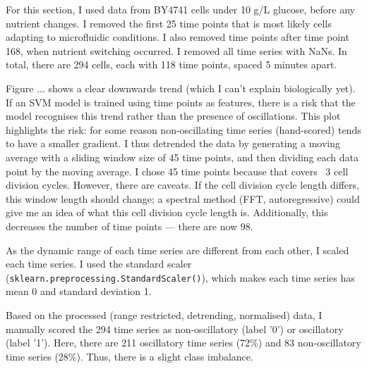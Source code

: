 


For this section, I used data from BY4741 cells under 10 g/L glucose, before any nutrient changes.
I removed the first 25 time points that is most likely cells adapting to microfluidic conditions.
I also removed time points after time point 168, when nutrient switching occurred.
I removed all time series with NaNs.
In total, there are 294 cells, each with 118 time points, spaced 5 minutes apart.



Figure ... shows a clear downwards trend (which I can't explain biologically yet). If an SVM model is trained using time points as features, there is a risk that the model recognises this trend rather than the presence of oscillations.
This plot highlights the risk: for some reason non-oscillating time series (hand-scored) tends to have a smaller gradient.
I thus detrended the data by generating a moving average with a sliding window size of 45 time points, and then dividing each data point by the moving average. I chose 45 time points because that covers ~3 cell division cycles.
However, there are caveats.
If the cell division cycle length differs, this window length should change; a spectral method (FFT, autoregressive) could give me an idea of what this cell division cycle length is.
Additionally, this decreases the number of time points --- there are now 98.

As the dynamic range of each time series are different from each other, I scaled each time series.
I used the standard scaler (\texttt{sklearn.preprocessing.StandardScaler()}), which makes each time series has mean 0 and standard deviation 1.


Based on the processed (range restricted, detrending, normalised) data, I manually scored the 294 time series as non-oscillatory (label '0') or oscillatory (label '1').
Here, there are 211 oscillatory time series (72\%) and 83 non-oscillatory time series (28\%).
Thus, there is a slight class imbalance.

